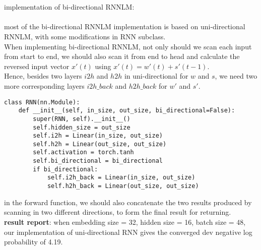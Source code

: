 \documentclass[11pt]{article}
\begin{document}
\part{}
\Large implementation of bi-directional RNNLM:\\
\\
\normalsize
\indent most of the bi-directional RNNLM implementation is based on uni-directional RNNLM, with some modifications in RNN subclass.\\
\indent When implementing bi-directional RNNLM, not only should we scan each input from start to end, we should also scan it from end to head and calculate the reversed input vector $x'(t)$ using $x'(t) = w'(t) + s'(t-1)$.\\
\indent Hence, besides two layers $i2h$ and $h2h$ in uni-directional for $w$ and $s$, we need two more corresponding layers $i2h\_back$ and $h2h\_back$ for $w'$ and $s'$. 
\begin{lstlisting}
class RNN(nn.Module):
    def __init__(self, in_size, out_size, bi_directional=False):
        super(RNN, self).__init__()
        self.hidden_size = out_size
        self.i2h = Linear(in_size, out_size)
        self.h2h = Linear(out_size, out_size)
        self.activation = torch.tanh
        self.bi_directional = bi_directional
        if bi_directional:
            self.i2h_back = Linear(in_size, out_size)
            self.h2h_back = Linear(out_size, out_size)
\end{lstlisting}
\leavevmode
\newline
\indent in the forward function, we should also concatenate the two results produced by scanning in two different directions, to form the final result for returning.\\
\indent \textbf{result report}: when embedding size = 32, hidden size = 16, batch size = 48,
our implementation of uni-directional RNN gives the converged dev negative log probability of 4.19.
\end{document}
